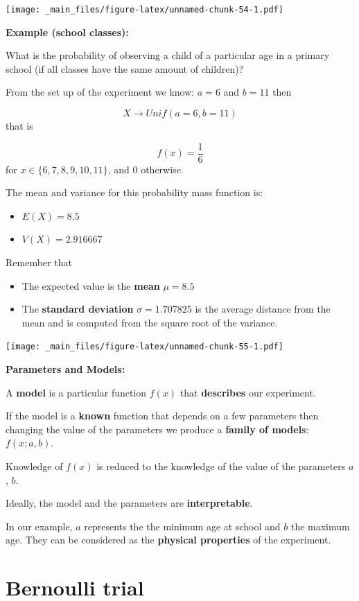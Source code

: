 \documentclass[
]{book}
\providecommand{\tightlist}{%
  \setlength{\itemsep}{0pt}\setlength{\parskip}{0pt}}
\begin{document}
\texttt{[image: \_main\_files/figure-latex/unnamed-chunk-54-1.pdf]}

\textbf{Example (school classes):}

What is the probability of observing a child of a particular age in a primary school (if all classes have the same amount of children)?

From the set up of the experiment we know: \(a=6\) and \(b=11\) then

\[X \rightarrow Unif(a=6, b=11)\] that is

\[f(x)=\frac{1}{6}\] for \(x\in \{6,7,8,9,10,11\}\), and \(0\) otherwise.

The mean and variance for this probability mass function is:

\begin{itemize}
\tightlist
\item
  \(E(X)=8.5\)
\item
  \(V(X)=2.916667\)
\end{itemize}

Remember that

\begin{itemize}
\item
  The expected value is the \textbf{mean} \(\mu=8.5\)
\item
  The \textbf{standard deviation} \(\sigma=1.707825\) is the average distance from the mean and is computed from the square root of the variance.
\end{itemize}

\texttt{[image: \_main\_files/figure-latex/unnamed-chunk-55-1.pdf]}

\textbf{Parameters and Models:}

A \textbf{model} is a particular function \(f(x)\) that \textbf{describes} our experiment.

If the model is a \textbf{known} function that depends on a few parameters then changing the value of the parameters we produce a \textbf{family of models}: \(f(x; a,b)\).

Knowledge of \(f(x)\) is reduced to the knowledge of the value of the parameters \(a\), \(b\).

Ideally, the model and the parameters are \textbf{interpretable}.

In our example, \(a\) represents the the minimum age at school and \(b\) the maximum age. They can be considered as the \textbf{physical properties} of the experiment.

\hypertarget{bernoulli-trial}{%
\section{Bernoulli trial}\label{bernoulli-trial}}
\end{document}
